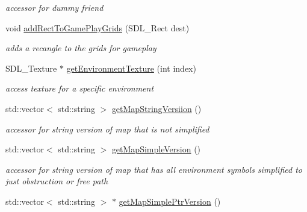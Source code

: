 \begin{DoxyCompactItemize}
\begin{DoxyCompactList}\small\item\em accessor for dummy friend \end{DoxyCompactList}\item 
\hypertarget{class_level_ac5fecd0532486e19176f0ca3dced9c23}{}\label{class_level_ac5fecd0532486e19176f0ca3dced9c23} 
void \hyperlink{class_level_ac5fecd0532486e19176f0ca3dced9c23}{add\+Rect\+To\+Game\+Play\+Grids} (S\+D\+L\+\_\+\+Rect dest)
\begin{DoxyCompactList}\small\item\em adds a recangle to the grids for gameplay \end{DoxyCompactList}\item 
\hypertarget{class_level_a419a998f8496fb65d593eea06b454f18}{}\label{class_level_a419a998f8496fb65d593eea06b454f18} 
S\+D\+L\+\_\+\+Texture $\ast$ \hyperlink{class_level_a419a998f8496fb65d593eea06b454f18}{get\+Environment\+Texture} (int index)
\begin{DoxyCompactList}\small\item\em access texture for a specific environment \end{DoxyCompactList}\item 
\hypertarget{class_level_a3ca47ac48d1454c5f68a3c61b8073ce1}{}\label{class_level_a3ca47ac48d1454c5f68a3c61b8073ce1} 
std\+::vector$<$ std\+::string $>$ \hyperlink{class_level_a3ca47ac48d1454c5f68a3c61b8073ce1}{get\+Map\+String\+Versiion} ()
\begin{DoxyCompactList}\small\item\em accessor for string version of map that is not simplified \end{DoxyCompactList}\item 
\hypertarget{class_level_a36e2b0bc3c817fa70eb4b618edcb6d70}{}\label{class_level_a36e2b0bc3c817fa70eb4b618edcb6d70} 
std\+::vector$<$ std\+::string $>$ \hyperlink{class_level_a36e2b0bc3c817fa70eb4b618edcb6d70}{get\+Map\+Simple\+Version} ()
\begin{DoxyCompactList}\small\item\em accessor for string version of map that has all environment symbols simplified to just obstruction or free path \end{DoxyCompactList}\item 
\hypertarget{class_level_a0e190e0b0c05bad7b6839f67cbd9e6e7}{}\label{class_level_a0e190e0b0c05bad7b6839f67cbd9e6e7} 
std\+::vector$<$ std\+::string $>$ $\ast$ \hyperlink{class_level_a0e190e0b0c05bad7b6839f67cbd9e6e7}{get\+Map\+Simple\+Ptr\+Version} ()

\end{DoxyCompactItemize}
